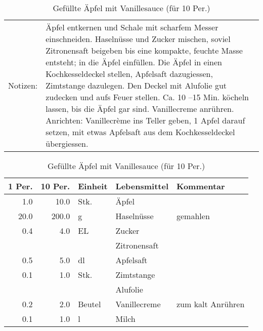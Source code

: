 \documentclass[11pt,a4paper]{article}%
\begin{document}
%
\vspace{0.75cm}%
\renewcommand{\arraystretch}{1.25}%


\begin{table}[h]%
\caption{Gefüllte Äpfel mit Vanillesauce (für 10 Per.)}%
\begin{tabularx}{\textwidth}{l X}%
Notizen:&Äpfel entkernen und Schale mit scharfem Messer einschneiden.\newline%
Haselnüsse und Zucker mischen, soviel Zitronensaft beigeben bis eine kompakte, feuchte Masse entsteht; in die Äpfel einfüllen.\newline%
\newline%
Die Äpfel in einen Kochkesseldeckel stellen, Apfelsaft dazugiessen, Zimtstange dazulegen. Den Deckel mit Alufolie gut zudecken und aufs Feuer stellen. Ca. 10 –15 Min. köcheln lassen, bis die Äpfel gar sind.\newline%
\newline%
Vanillecreme anrühren.\newline%
\newline%
Anrichten: Vanillecrème ins Teller geben, 1 Apfel darauf setzen, mit etwas Apfelsaft aus dem Kochkesseldeckel übergiessen.\newline%
\newline%
\\%
\end{tabularx}%
\par%
\begin{tabularx}{\textwidth}{| r | r | l | l | X |}%
\hline%
\tiny{1 Per.}&\tiny{10 Per.}&\tiny{Einheit}&\tiny{Lebensmittel}&\tiny{Kommentar}\\%
\hline%
1.0&10.0&Stk.&Äpfel&\\%
\hline%
20.0&200.0&g&Haselnüsse&gemahlen\\%
\hline%
0.4&4.0&EL&Zucker&\\%
\hline%
&&&Zitronensaft&\\%
\hline%
0.5&5.0&dl&Apfelsaft&\\%
\hline%
0.1&1.0&Stk.&Zimtstange&\\%
\hline%
&&&Alufolie&\\%
\hline%
0.2&2.0&Beutel&Vanillecreme&zum kalt Anrühren\\%
\hline%
0.1&1.0&l&Milch&\\%
\hline%
\end{tabularx}%
\end{table}

%
\vspace{0.75cm}%
\renewcommand{\arraystretch}{1.25}%
\end{document}
